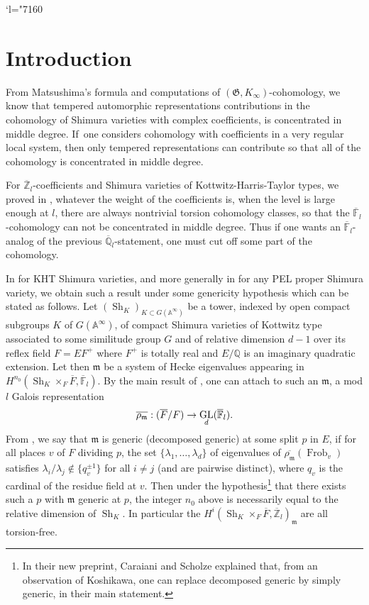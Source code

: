 \documentclass[JEP,XML,SOM,Unicode,published]{cedram}
\newcommand{\Changel}{\mathcode`l="7160}
\newcommand{\NoChangel}[1]{%
\expandafter\let\csname old\string#1\endcsname=#1
\let#1=\relax
\newcommand{#1}{\mathcode`l="716C\csname old\string#1\endcsname\mathcode`l="7160 }%
}
\DeclareMathOperator{\GL}{GL}
\theoremstyle{plain}
\theoremstyle{definition}
\numberwithin{equation}{subsection}
\newcommand\Am{{\mathbb A}}
\newcommand\Fm{{\mathbb F}}
\newcommand\Qm{{\mathbb Q}}
\newcommand\Zm{{\mathbb Z}}
\DeclareMathOperator{\sh}{Sh}
\DeclareMathOperator{\frob}{Frob}
\DeclareMathOperator{\gal}{Gal}\NoChangel{\gal}
\let \oo=\infty
\begin{document}
\maketitle
\vspace*{-\baselineskip}
\tableofcontents
\mainmatter

\Changel
\section*{Introduction}

From Matsushima's formula and computations of $(\mathfrak G,K_\oo)$-cohomology,
we know that tempered automorphic representations contributions in the cohomology
of Shimura varieties with complex coefficients, is concentrated in middle degree.
If~one considers cohomology with coefficients in a very regular local system, then
only tempered representations can contribute so that all of the cohomology is concentrated
in middle degree.

For $\overline \Zm_l$-coefficients and Shimura varieties of Kottwitz-Harris-Taylor types,
we proved in \cite{boyer-stabilization}, whatever the weight of
the coefficients is, when the level is large enough at $l$, there are always nontrivial torsion
cohomology classes, so that the $\overline \Fm_l$\nobreakdash-co\-ho\-mology can not be concentrated in middle
degree. Thus if one wants an $\overline \Fm_l$-analog of the previous $\overline \Qm_l$-statement,
one must cut off some part of the cohomology.

In \cite{boyer-imj} for KHT Shimura varieties, and more generally
in \cite{scholze-cara} for any PEL proper Shimura variety, we obtain such a result
under some genericity hypothesis which can be stated as follows.
Let $(\sh_K)_{K \subset G(\Am^\oo)}$ be a tower, indexed by open compact subgroups
$K$ of $G(\Am^\oo)$, of compact Shimura varieties of Kottwitz type associated to some
similitude group $G$ and of relative dimension $d-1$ over its reflex field $F=EF^+$
where $F^+$ is totally real and $E/\Qm$ is an imaginary quadratic extension.
Let then $\mathfrak m$ be a system of Hecke eigenvalues appearing in
$H^{n_0}(\sh_K \times_F \overline F,\overline \Fm_l)$.
By the main result of \cite{scholze-torsion}, one can attach to such an $\mathfrak m$,
a mod $l$ Galois representation
\[
\overline{\rho_{\mathfrak m}}: \gal(\overline F/F) \to \GL_d(\overline \Fm_l).
\]
From \cite[Def.\,19]{scholze-cara},
we say that $\mathfrak m$ is generic (\resp decomposed generic) at some split $p$ in $E$,
if for all places $v$ of $F$ dividing $p$,
the set $\{\lambda_1,\dots,\lambda_d\}$ of eigenvalues of
$\overline{\rho_{\mathfrak m}}(\frob_v)$
satisfies $\lambda_i/\lambda_j \not \in \{q_v^{\pm 1}\}$ for all $i \neq j$
(\resp and are pairwise distinct), where $q_v$ is the cardinal
of the residue field at $v$. Then under the hypothesis\footnote{In their new preprint, Caraiani and Scholze explained that, from an observation of Koshikawa, one can replace decomposed generic
by simply generic, in their main statement.} that there exists such a $p$ with
$\mathfrak m$ generic at $p$, the integer $n_0$ above is necessarily equal to
the relative dimension of $\sh_K$. In particular the
$H^i(\sh_K \times_F \overline F,\overline \Zm_l)_{\mathfrak m}$
are all torsion-free.
\end{document}
